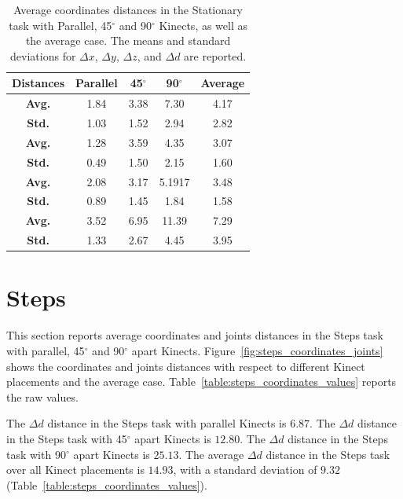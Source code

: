 \begin{table}[!h]
\centering
  
  \begin{tabulary}{1.0\linewidth}{||c c c c c||} 
   \hline
   \textbf{Distances} & \textbf{Parallel} & \textbf{45$^{\circ}$} & \textbf{90$^{\circ}$} & \textbf{Average} \\ [0.5ex] 
   \hline\hline
   \textbf{Avg.}  & 1.84 & 3.38 & 7.30 & 4.17 \\
   \hline
   \textbf{Std.}  & 1.03 & 1.52 & 2.94 & 2.82 \\
   \hline
   \textbf{Avg.}  & 1.28 & 3.59 & 4.35 & 3.07 \\
   \hline
   \textbf{Std.}  & 0.49 & 1.50 & 2.15 & 1.60 \\
   \hline
   \textbf{Avg.}  & 2.08 & 3.17 & 5.1917 & 3.48 \\
   \hline
   \textbf{Std.}  & 0.89 & 1.45 & 1.84 & 1.58 \\
   \hline
   \textbf{Avg.}  & 3.52 & 6.95 & 11.39 & 7.29 \\
   \hline
   \textbf{Std.}  & 1.33 & 2.67 & 4.45 & 3.95 \\
   \hline
  \end{tabulary}
  
  \caption{Average coordinates distances in the Stationary task with Parallel, 45$^{\circ}$ and 90$^{\circ}$ Kinects, as well as the average case. The means and standard deviations for $\Delta x$, $\Delta y$, $\Delta z$, and $\Delta d$ are reported.}
  
  \label{table:stationary_coordinates_values}
\end{table}

\section{Steps}
\label{sec:results_steps}

This section reports average coordinates and joints distances in the Steps task with parallel, 45$^{\circ}$ and 90$^{\circ}$ apart Kinects. Figure~\ref{fig:steps_coordinates_joints} shows the coordinates and joints distances with respect to different Kinect placements and the average case. Table~\ref{table:steps_coordinates_values} reports the raw values.

The $\Delta d$ distance in the Steps task with parallel Kinects is $6.87$. The $\Delta d$ distance in the Steps task with 45$^{\circ}$ apart Kinects is $12.80$. The $\Delta d$ distance in the Steps task with 90$^{\circ}$ apart Kinects is $25.13$. The average $\Delta d$ distance in the Steps task over all Kinect placements is $14.93$, with a standard deviation of $9.32$ (Table~\ref{table:steps_coordinates_values}).


